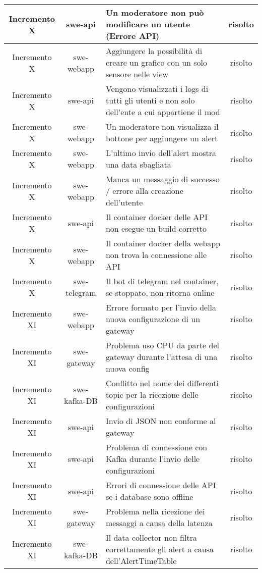 \begin{center}
\begin{longtable}{|c|c|p{9.5cm}|c|}
    \hline
    Incremento X & swe-api & Un moderatore non può modificare un utente (Errore API) & risolto \\
    \hline
    Incremento X & swe-webapp & Aggiungere la possibilità di creare un grafico con un solo sensore nelle view & risolto \\
    \hline
    Incremento X & swe-api & Vengono visualizzati i logs di tutti gli utenti e non solo dell'ente a cui appartiene il mod & risolto \\
    \hline
    Incremento X & swe-webapp & Un moderatore non visualizza il bottone per aggiungere un alert & risolto \\
    \hline
    Incremento X & swe-webapp & L'ultimo invio dell'alert mostra una data sbagliata  & risolto \\
    \hline
    Incremento X & swe-webapp & Manca un messaggio di successo / errore alla creazione dell'utente & risolto \\
    \hline
    Incremento X & swe-api & Il container docker delle API non esegue un build corretto & risolto \\
    \hline
    Incremento X & swe-webapp & Il container docker della webapp non trova la connessione alle API & risolto \\
    \hline
    Incremento X & swe-telegram & Il bot di telegram nel container, se stoppato, non ritorna online & risolto \\
    \hline
    Incremento XI & swe-webapp & Errore formato per l'invio della nuova configurazione di un gateway & risolto \\
    \hline
    Incremento XI & swe-gateway & Problema uso CPU da parte del gateway durante l'attesa di una nuova config  & risolto \\
    \hline
    Incremento XI & swe-kafka-DB & Conflitto nel nome dei differenti topic per la ricezione delle configurazioni & risolto \\
    \hline
    Incremento XI & swe-api & Invio di JSON non conforme al gateway & risolto \\
    \hline
    Incremento XI & swe-api & Problema di connessione con Kafka durante l'invio delle configurazioni & risolto \\
    \hline
    Incremento XI & swe-api & Errori di connessione delle API se i database sono offline & risolto \\
    \hline
    Incremento XI & swe-gateway & Problema nella ricezione dei messaggi a causa della latenza  & risolto \\
    \hline
    Incremento XI & swe-kafka-DB & Il data collector non filtra correttamente gli alert a causa dell'AlertTimeTable & risolto \\

\end{longtable}
\end{center}
